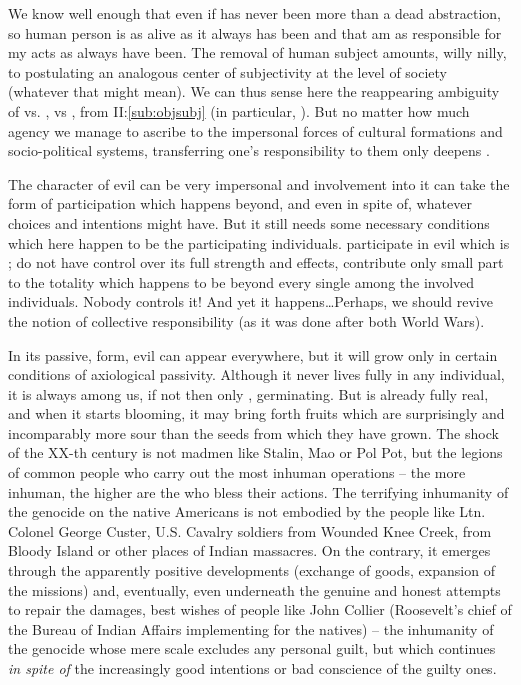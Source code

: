 We know well enough that even if  has never been more than a dead
abstraction, so human person is as alive as it always has
been and that  am as responsible for my acts as  always have been. The
removal of human subject amounts, willy nilly, to postulating an analogous center of
subjectivity at the level of society (whatever that might mean). 
We can thus sense here the reappearing ambiguity of 
vs. ,  vs ,
from II:\ref{sub:objsubj} (in particular, ). But no matter
how much agency we manage to ascribe to the impersonal forces of cultural
formations and socio-political systems, transferring one's responsibility to
them only deepens . 

\pa
The character of evil can be very impersonal and involvement into it can take
the form of participation which happens beyond, and even in spite of, whatever
 choices and intentions  might have. But it still needs
some necessary conditions which here happen to be the participating individuals.
 participate in evil which is ;  do not have
control over its full strength and effects,  contribute only  small
part to the totality which happens to be beyond every single among the involved
individuals. Nobody controls it! And yet it happens\ldots Perhaps, we should revive
the notion of collective responsibility (as it was done after both World Wars).

%
In its passive,  form, evil can appear everywhere, but it will grow
only in certain conditions of axiological passivity. Although it never lives
fully in any individual, it is always among us, if not  then only
, germinating. But  is already fully real, and
when it starts blooming, it may bring forth fruits which are 
surprisingly and incomparably more sour than the seeds from which they have
grown. The shock of the XX-th century is not madmen like Stalin, Mao or Pol Pot,
but the legions of common people who carry out the most inhuman operations --
the more inhuman, the higher are the  who bless their actions.
The
terrifying inhumanity of the genocide on the native Americans is not embodied by
the people like Ltn. Colonel George Custer, U.S. Cavalry soldiers from Wounded Knee
Creek, from Bloody Island or other places of Indian massacres.  
On the contrary, it emerges through the 
apparently positive developments (exchange of goods, expansion of the missions)
and, eventually, even underneath the genuine and honest attempts to repair the
damages, best wishes of people like John Collier (Roosevelt's chief of the Bureau
of Indian Affairs implementing  for the natives) -- the inhumanity of
the genocide whose mere scale excludes any personal guilt, 
but which continues {\em in spite of} the increasingly good intentions or
bad conscience of the guilty ones.

